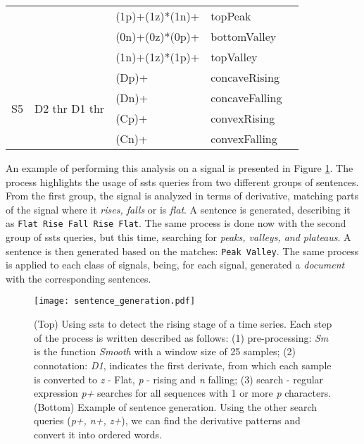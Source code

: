\begin{table}
\begin{center}
\begin{tabularx}{\linewidth}{ XXXXX }
 & & (1p)+(1z)*(1n)+ & \textcolor{myblue2}{topPeak}\\
 & & (0n)+(0z)*(0p)+ & \textcolor{mypurple}{bottomValley}\\
 & & (1n)+(1z)*(1p)+ & \textcolor{myorange}{topValley}\\
 \hline
\multirow{4}{1em}{S5} & \multirow{4}{6em}{D2 thr D1 thr} & (Dp)+ & concaveRising\\
& & (Dn)+ & concaveFalling\\
& & (Cp)+ & convexRising\\
& &(Cn)+ & convexFalling\\
\bottomrule[1.5pt]
\end{tabularx}
\label{tab:ssts_queries}
\end{center}
\end{table}
 
An example of performing this analysis on a signal is presented in Figure \ref{fig:SSTS_example}. The process highlights the usage of \gls{ssts} queries from two different groups of sentences. From the first group, the signal is analyzed in terms of derivative, matching parts of the signal where it \textit{rises, falls} or is \textit{flat}. A sentence is generated, describing it as \texttt{Flat Rise Fall Rise Flat}. The same process is done now with the second group of \gls{ssts} queries, but this time, searching for \textit{peaks, valleys, and plateaus}. A sentence is then generated based on the matches: \texttt{Peak Valley}. The same process is applied to each class of signals, being, for each signal, generated a \textit{document} with the corresponding sentences.

\begin{figure}[!h]
    \centering
    \texttt{[image: sentence\_generation.pdf]}
    \caption{(Top) Using \gls{ssts} to detect the rising stage of a time series. Each step of the process is written described as follows: (1) pre-processing: \textit{Sm} is the function \textit{Smooth} with a window size of 25 samples; (2) connotation: \textit{D1}, indicates the first derivate, from which each sample is converted to \textit{z} - Flat, \textit{p} - rising and \textit{n} falling; (3) search - regular expression \textit{p+} searches for all sequences with 1 or more \textit{p} characters. (Bottom) Example of sentence generation. Using the other search queries (\textit{p+, n+, z+}), we can find the derivative patterns and convert it into ordered words.}
    \label{fig:SSTS_example}
\end{figure}

